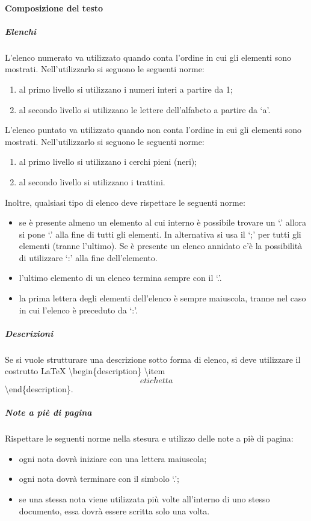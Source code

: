 			\paragraph{Composizione del testo}
				\subparagraph{Elenchi}
					L’elenco numerato va utilizzato quando conta l’ordine in cui gli elementi sono mostrati. Nell’utilizzarlo si seguono le seguenti norme:
					\begin{enumerate}
						\item al primo livello si utilizzano i numeri interi a partire da 1;
						\item al secondo livello si utilizzano le lettere dell’alfabeto a partire da ‘a’.
					\end{enumerate}
					L’elenco puntato va utilizzato quando non conta l’ordine in cui gli elementi sono mostrati. Nell’utilizzarlo si seguono le seguenti norme:
					\begin{enumerate}
						\item al primo livello si utilizzano i cerchi pieni (neri);
						\item al secondo livello si utilizzano i trattini.
					\end{enumerate}
					Inoltre, qualsiasi tipo di elenco deve rispettare le seguenti norme:
					\begin{itemize}
						\item se è presente almeno un elemento al cui interno è possibile trovare un ‘.’ allora si pone ‘.’ alla fine di tutti gli elementi. In alternativa si usa il ‘;’ per tutti gli elementi (tranne l’ultimo). Se è presente un elenco annidato c’è la possibilità di utilizzare ‘:’ alla fine dell’elemento.
						\item l’ultimo elemento di un elenco termina sempre con il ‘.’.
						\item la prima lettera degli elementi dell’elenco è sempre maiuscola, tranne nel caso in cui l’elenco è preceduto da ‘:’.
					\end{itemize}
				\subparagraph{Descrizioni}
					Se si vuole strutturare una descrizione sotto forma di elenco, si deve utilizzare il costrutto \LaTeX{} \textbackslash begin\{description\} \textbackslash item\[etichetta\] \textbackslash end\{description\}.
				\subparagraph{Note a piè di pagina}
					Rispettare le seguenti norme nella stesura e utilizzo delle note a piè di pagina:
					\begin{itemize}
						\item ogni nota dovrà iniziare con una lettera maiuscola;
						\item ogni nota dovrà terminare con il simbolo ‘.’;
						\item se una stessa nota viene utilizzata più volte all’interno di uno stesso documento, essa dovrà essere scritta solo una volta.
					\end{itemize}
